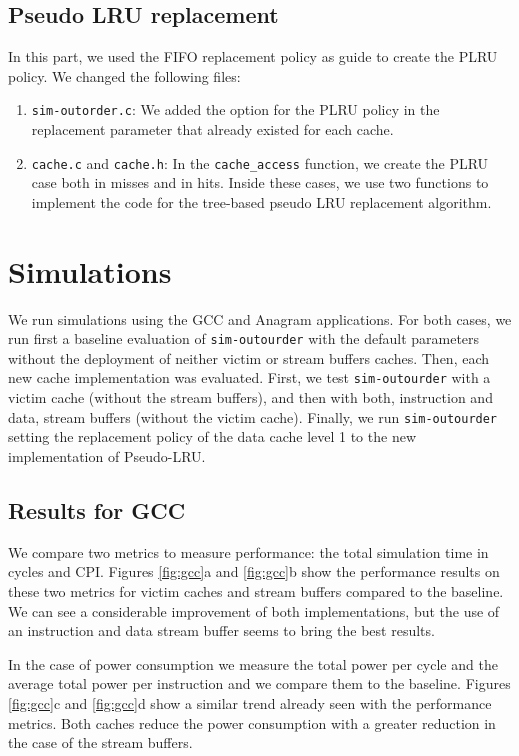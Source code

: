 \documentclass[10pt]{scrartcl}
\begin{document}
\subsection{Pseudo LRU replacement}
In this part, we used the FIFO replacement policy as guide to create the PLRU policy. We changed the following files:

\begin{enumerate}
\item \texttt{sim-outorder.c}: We added the option for the PLRU policy in the replacement parameter that already existed for each cache. 
\item \texttt{cache.c} and \texttt{cache.h}: In the \texttt{cache\_access} function, we create the PLRU case both in misses and in hits. Inside these cases, we use two functions to implement the code for the tree-based pseudo LRU replacement algorithm. 
\end{enumerate}

\section{Simulations}
We run simulations using the GCC and Anagram applications.  For both cases, we run first a baseline evaluation of \texttt{sim-outourder} with the default parameters without the deployment of neither victim or stream buffers caches.  Then, each new cache implementation was evaluated.  First, we test \texttt{sim-outourder} with a victim cache (without the stream buffers), and then with both, instruction and data, stream buffers (without the victim cache).  Finally, we run \texttt{sim-outourder} setting the replacement policy of the data cache level 1 to the new implementation of Pseudo-LRU.
\subsection{Results for GCC}
We compare two metrics to measure performance: the total simulation time in cycles and CPI.  Figures \ref{fig:gcc}a and \ref{fig:gcc}b show the performance results on these two metrics for victim caches and stream buffers compared to the baseline.  We can see a considerable improvement of both implementations, but the use of an instruction and data stream buffer seems to bring the best results.

In the case of power consumption we measure the total power per cycle and the average total power per instruction and we compare them to the baseline.  Figures \ref{fig:gcc}c and \ref{fig:gcc}d show a similar trend already seen with the performance metrics.  Both caches reduce the power consumption with a greater reduction in the case of the stream buffers. 
\end{document}
